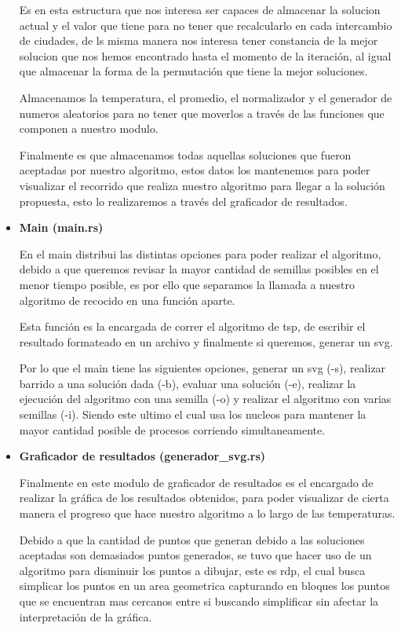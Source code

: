 \begin{multicols}{2}
\begin{itemize}
  Es en esta estructura que nos interesa ser capaces de almacenar la solucion actual y el valor que tiene para no tener que recalcularlo en cada intercambio de ciudades, de ls misma manera nos interesa tener constancia de la mejor solucion que nos hemos encontrado hasta el momento de la iteración, al igual que almacenar la forma de la permutación que tiene la mejor soluciones.

  Almacenamos la temperatura, el promedio, el normalizador y el generador de numeros aleatorios para no tener que moverlos a través de las funciones que componen a nuestro modulo.

  Finalmente es que almacenamos todas aquellas soluciones que fueron aceptadas por nuestro algoritmo, estos datos los mantenemos para poder visualizar el recorrido que realiza nuestro algoritmo para llegar a la solución propuesta, esto lo realizaremos a través del graficador de resultados.
  
\item \textbf{Main (main.rs)}

  En el main distribui las distintas opciones para poder realizar el algoritmo, debido a que queremos revisar la mayor cantidad de semillas posibles en el menor tiempo posible, es por ello que separamos la llamada a nuestro algoritmo de recocido en una función aparte.

  Esta función es la encargada de correr el algoritmo de tsp, de escribir el resultado formateado en un archivo y finalmente si queremos, generar un svg.

  Por lo que el main tiene las siguientes opciones, generar un svg (-s), realizar barrido a una solución dada (-b), evaluar una solución (-e), realizar la ejecución del algoritmo con una semilla (-o) y realizar el algoritmo con varias semillas (-i). Siendo este ultimo el cual usa los nucleos para mantener la mayor cantidad posible de procesos corriendo simultaneamente.

\item \textbf{Graficador de resultados (generador\_svg.rs)}

  Finalmente en este modulo de graficador de resultados es el encargado de realizar la gráfica de los resultados obtenidos, para poder visualizar de cierta manera el progreso que hace nuestro algoritmo a lo largo de las temperaturas.

  Debido a que la cantidad de puntos que generan debido a las soluciones aceptadas son demasiados puntos generados, se tuvo que hacer uso de un algoritmo para disminuir los puntos a dibujar, este es rdp, el cual busca simplicar los puntos en un area geometrica capturando en bloques los puntos que se encuentran mas cercanos entre si buscando simplificar sin afectar la interpretación de la gráfica.


\end{itemize}
\end{multicols}

